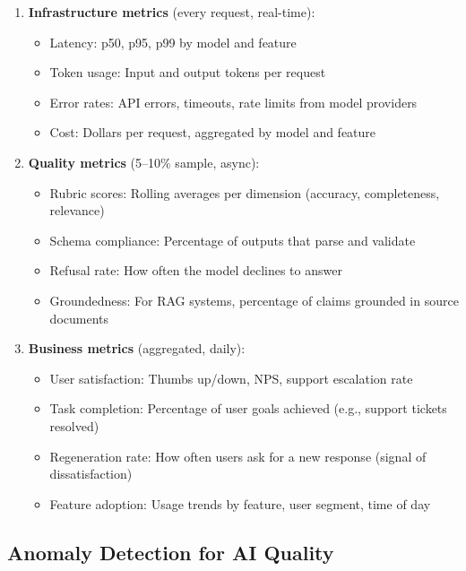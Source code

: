 \begin{enumerate}[leftmargin=*]
    \item \textbf{Infrastructure metrics} (every request, real-time):
    \begin{itemize}
        \item Latency: p50, p95, p99 by model and feature
        \item Token usage: Input and output tokens per request
        \item Error rates: API errors, timeouts, rate limits from model providers
        \item Cost: Dollars per request, aggregated by model and feature
    \end{itemize}
    
    \item \textbf{Quality metrics} (5--10\% sample, async):
    \begin{itemize}
        \item Rubric scores: Rolling averages per dimension (accuracy, completeness, relevance)
        \item Schema compliance: Percentage of outputs that parse and validate
        \item Refusal rate: How often the model declines to answer
        \item Groundedness: For RAG systems, percentage of claims grounded in source documents
    \end{itemize}
    
    \item \textbf{Business metrics} (aggregated, daily):
    \begin{itemize}
        \item User satisfaction: Thumbs up/down, NPS, support escalation rate
        \item Task completion: Percentage of user goals achieved (e.g., support tickets resolved)
        \item Regeneration rate: How often users ask for a new response (signal of dissatisfaction)
        \item Feature adoption: Usage trends by feature, user segment, time of day
    \end{itemize}
\end{enumerate}

\subsection{Anomaly Detection for AI Quality}

